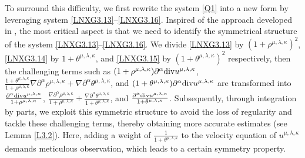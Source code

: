 \documentclass[reqno,11pt]{amsart}
\theoremstyle{plain}
\numberwithin{equation}{section}
\begin{document}
To surround   this difficulty, we first rewrite the system \eqref{Q1} into a new form by leveraging 
system \eqref{LNXG3.13}--\eqref{LNXG3.16}. Inspired of the approach developed in \cite{At-ARMA-2006,JJLX-2014}, 
the most critical aspect is that we need to identify the symmetrical structure of 
the system \eqref{LNXG3.13}--\eqref{LNXG3.16}. We   divide \eqref{LNXG3.13} 
by $(1+\rho^{\mu,\lambda,\kappa})^2$, \eqref{LNXG3.14} by $ 1+\theta^{\mu,\lambda,\kappa} $, 
and \eqref{LNXG3.15} by $(1+\theta^{\mu,\lambda,\kappa})^2$ respectively, then  the challenging terms
 such as $(1+\rho^{\mu,\lambda,\kappa})\partial^\alpha{\rm div}{u}^{\mu,\lambda,\kappa}$, 
 $\frac{1+\theta^{\mu,\lambda,\kappa}}{1+\rho^{\mu,\lambda,\kappa}}
 \nabla\partial^\alpha\rho^{\mu,\lambda,\kappa}+\nabla\partial^\alpha\theta^{\mu,\lambda,\kappa}$, 
 and $(1+\theta^{\mu,\lambda,\kappa})\partial^\alpha{\rm div}u^{\mu,\lambda,\kappa}$ 
 are transformed into $\frac{\partial^\alpha{\rm div}{u}^{\mu,\lambda,\kappa}}{1+\rho^{\mu,\lambda,\kappa}}$, 
 $\frac{\nabla\partial^\alpha\rho^{\mu,\lambda,\kappa}}{1+\rho^{\mu,\lambda,\kappa}}
 +\frac{\nabla\partial^\alpha\theta^{\mu,\lambda,\kappa}}{1+\theta^{\mu,\lambda,\kappa}}$, 
 and $\frac{\partial^\alpha{\rm div}u^{\mu,\lambda,\kappa}}{1+\theta^{\mu,\lambda,\kappa}}$. 
 Subsequently, through integration by parts, we   exploit this symmetric structure to avoid 
 the loss of regularity and tackle these challenging terms, thereby obtaining more accurate 
 estimates (see Lemma \ref{L3.2}).
  Here, adding a weight of $\frac{1}{1+\theta^{\mu,\lambda,\kappa}}$ to the velocity 
  equation of $u^{\mu,\lambda,\kappa}$ 
demands meticulous observation, which leads to a certain symmetry property. 
 
\end{document}
